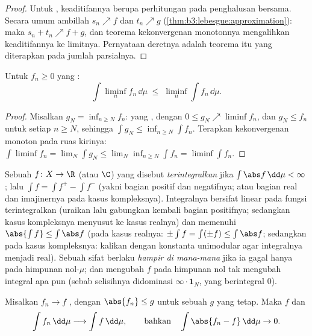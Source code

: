 \begin{proof}
Untuk , keaditifannya berupa perhitungan pada
penghalusan bersama. Secara umum ambillah $s_n \nearrow f$ dan $t_n \nearrow g$
(\cref{thm:b3:lebesgue:approximation}): maka $s_n + t_n \nearrow f +
g$, dan teorema kekonvergenan monotonnya mengalihkan keaditifannya ke limitnya. Pernyataan
deretnya adalah teorema itu yang diterapkan pada jumlah parsialnya.
\end{proof}

\begin{theorem}\label{thm:b3:lebesgue:fatou}
Untuk $f_n \geq 0$ yang :
\[
\int \liminf_n f_n \,\dd\mu \;\leq\; \liminf_n \int
f_n\,\dd\mu .
\]
\end{theorem}

\begin{proof}
Misalkan $g_N = \inf_{n\geq N}f_n$: yang , dengan $0 \leq g_N \nearrow
\liminf f_n$, dan $g_N \leq f_n$ untuk setiap $n \geq N$, sehingga
$\int g_N \leq \inf_{n \geq N}\int f_n$. Terapkan kekonvergenan monoton pada ruas
kirinya: $\int\liminf f_n = \lim_N\int g_N \leq
\lim_N\inf_{n\geq N}\int f_n = \liminf\int f_n$.
\end{proof}

\begin{definition}\label{def:b3:lebesgue:l1}
Sebuah $f \colon X \to \R$ (atau $\C$) yang  disebut
\emph{terintegralkan} jika $\int\abs
f\,\dd\mu < \infty$; lalu $\int f = \int f^+ - \int f^-$
(yakni bagian positif dan negatifnya; atau bagian real dan imajinernya pada
kasus kompleksnya). Integralnya bersifat linear pada fungsi terintegralkan
(uraikan lalu gabungkan kembali bagian positifnya; sedangkan kasus kompleksnya
menyusut ke kasus realnya) dan memenuhi $\abs{\int f} \leq
\int\abs f$ (pada kasus realnya: $\pm\int f = \int(\pm f) \leq
\int\abs f$; sedangkan pada kasus kompleksnya: kalikan dengan konstanta unimodular
agar integralnya menjadi real). Sebuah sifat berlaku \emph{hampir
di mana-mana} jika ia gagal hanya pada
himpunan nol-$\mu$; dan mengubah $f$ pada himpunan nol tak mengubah
integral apa pun (sebab selisihnya didominasi $\infty\cdot\mathbf
1_N$, yang berintegral $0$).
\end{definition}

\begin{theorem}\label{thm:b3:lebesgue:dct}
Misalkan $f_n \to f$ , dengan $\abs{f_n} \leq g$  untuk sebuah
$g$ \emph{} yang tetap. Maka $f$  dan
\[
\int f_n\,\dd\mu \longrightarrow \int f\,\dd\mu,
\qquad\text{bahkan}\quad \int\abs{f_n - f}\,\dd\mu \to 0 .
\]
\end{theorem}

